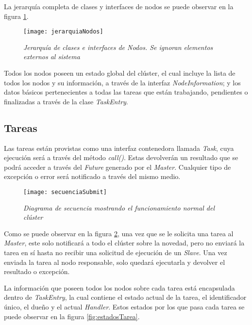 \documentclass[12pt,a4paper,oneside,spanish]{report}
\begin{document}
La jerarquía completa de clases y interfaces de nodos se puede observar en la figura \ref{fig:jerarquiaNodos}.

\begin{figure}
\centering
\texttt{[image: jerarquiaNodos]}
\caption{\textit{Jerarquía de clases e interfaces de Nodos. Se ignoran elementos externos al sistema}}
\label{fig:jerarquiaNodos}
\end{figure}


Todos los nodos poseen un estado global del clúster, el cual incluye la lista de todos los nodos y su información, a través de la interfaz \textit{NodeInformation}; y los datos básicos pertenecientes a todas las tareas que están trabajando, pendientes o finalizadas a través de la clase \textit{TaskEntry}.




\subsection*{Tareas}

Las tareas están provistas como una interfaz contenedora llamada \textit{Task}, cuya ejecución será a través del método \textit{call()}. Estas devolverán un resultado que se podrá acceder a través del \textit{Future} generado por el \textit{Master}. Cualquier tipo de excepción o error será notificado a través del mismo medio.


\begin{figure}
\centering
\texttt{[image: secuenciaSubmit]}
\caption{\textit{Diagrama de secuencia mostrando el funcionamiento normal del clúster}}
\label{fig:secuenciaSubmit}
\end{figure}

Como se puede observar en la figura \ref{fig:secuenciaSubmit}, una vez que se le solicita una tarea al \textit{Master}, este solo notificará a todo el clúster sobre la novedad, pero no enviará la tarea en sí hasta no recibir una solicitud de ejecución de un \textit{Slave}. Una vez enviada la tarea al nodo responsable, solo quedará ejecutarla y devolver el resultado o excepción. 

La información que poseen todos los nodos sobre cada tarea está encapsulada dentro de \textit{TaskEntry}, la cual contiene el estado actual de la tarea, el identificador único, el dueño y el actual \textit{Handler}. Estos estados por los que pasa cada tarea se puede observar en la figura \ref{fig:estadosTarea}.
\end{document}
